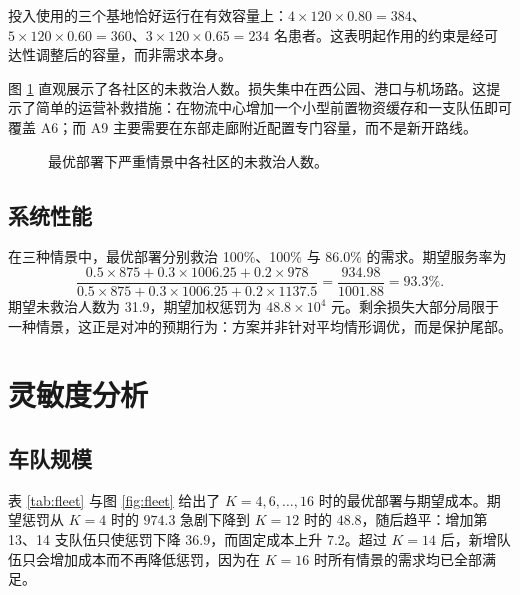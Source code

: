 \documentclass[12pt,a4paper,fontset=windows]{ctexart}
\begin{document}
投入使用的三个基地恰好运行在有效容量上：$4\times120\times0.80=384$、$5\times120\times0.60=360$、$3\times120\times0.65=234$ 名患者。这表明起作用的约束是经可达性调整后的容量，而非需求本身。

图 \ref{fig:unmet} 直观展示了各社区的未救治人数。损失集中在西公园、港口与机场路。这提示了简单的运营补救措施：在物流中心增加一个小型前置物资缓存和一支队伍即可覆盖 A6；而 A9 主要需要在东部走廊附近配置专门容量，而不是新开路线。

\begin{figure}[!ht]
\centering
{}
\caption{最优部署下严重情景中各社区的未救治人数。}
\label{fig:unmet}
\end{figure}

\subsection{系统性能}

在三种情景中，最优部署分别救治 100\%、100\% 与 86.0\% 的需求。期望服务率为
\[
\frac{0.5\times875+0.3\times1006.25+0.2\times978}{0.5\times875+0.3\times1006.25+0.2\times1137.5}
=\frac{934.98}{1001.88}=93.3\%.
\]
期望未救治人数为 31.9，期望加权惩罚为 $48.8\times10^{4}$ 元。剩余损失大部分局限于一种情景，这正是对冲的预期行为：方案并非针对平均情形调优，而是保护尾部。

\section{灵敏度分析}

\subsection{车队规模}

表 \ref{tab:fleet} 与图 \ref{fig:fleet} 给出了 $K=4,6,\dots,16$ 时的最优部署与期望成本。期望惩罚从 $K=4$ 时的 $974.3$ 急剧下降到 $K=12$ 时的 $48.8$，随后趋平：增加第 13、14 支队伍只使惩罚下降 $36.9$，而固定成本上升 $7.2$。超过 $K=14$ 后，新增队伍只会增加成本而不再降低惩罚，因为在 $K=16$ 时所有情景的需求均已全部满足。
\end{document}
